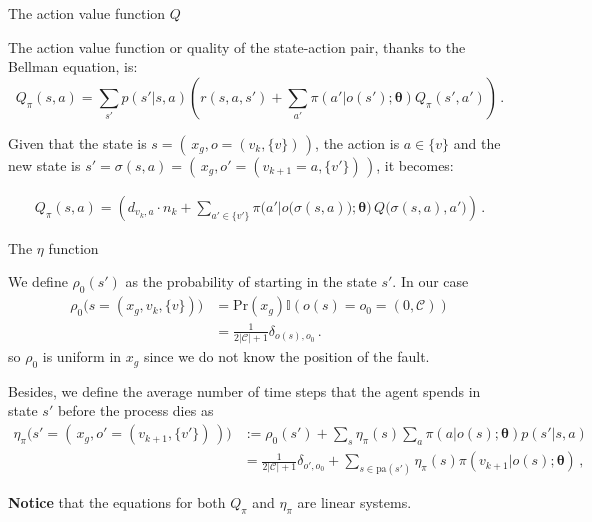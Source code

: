 \documentclass[10pt, aspectratio=169, compress, protectframetitle, handout]{beamer}
\begin{document}
\begin{frame}{The action value function $Q$}
    
    The \alert{action value function} or \alert{quality} of the state-action pair, thanks to the Bellman equation, is:
    \begin{equation*}
        Q_\pi(s,a) = \sum_{s'} p(s' | s,a) \left(r(s,a,s') + \sum_{a'} \pi(a'|o(s'); \boldsymbol \theta) Q_\pi(s',a') \right) \, .
    \end{equation*}
    
    Given that the state is $s = ( \, x_g, o = (v_k, \{v\}) \, )$, the action is $a \in \{v\}$ and the new state is $s' = \sigma(s,a) = ( \, x_g, o' = (v_{k+1}=a, \{v'\}) \, )$, it becomes:

    \begin{align*}
            Q_\pi(s,a) = \left(d_{v_k, a} \cdot n_{k} + \sum_{a' \in \{v'\}} \pi \Big( a' \big| o \big( \sigma(s,a) \big); \boldsymbol \theta \Big) \, Q \big( \sigma(s,a), a' \big) \right) \,.
    \end{align*}
    
\end{frame}

\begin{frame}{The $\eta$ function}

    We define $\rho_0(s')$ as the probability of starting in the state $s'$. In our case
    \begin{align*}
            \rho_0 \Big(s = ( x_g, v_k, \{v\}) \Big)
            &= \text{Pr}(x_g) \mathbb I(o(s) = o_0 = (0, \mathcal C)) \\
            &= \frac1{2|\mathcal C| + 1} \delta_{o(s), o_0} \, .
    \end{align*}
    so $\rho_0$ is uniform in $x_g$ since we do not know the position of the fault.
    
    Besides, we define the average number of time steps that the agent spends in state $s'$ before the process dies as
    \begin{align*}
            \eta_\pi\Big(s' = (\, x_g, o'=(v_{k+1}, \{v'\}) \,) \Big) &:= \rho_0(s') + \sum_s \eta_\pi(s) \sum_a \pi(a | o(s); \boldsymbol \theta) p(s' | s, a) \\
            &= \frac{1}{2|\mathcal C|+1} \delta_{o', o_0} + \sum_{s \in \mathrm{pa}(s')} \eta_\pi(s) \pi(v_{k+1} | o(s); \boldsymbol \theta) \, ,
    \end{align*}
    
    \textbf{Notice} that the equations for both $Q_\pi$ and $\eta_\pi$ are \alert{linear systems}.

\end{frame}
\end{document}
